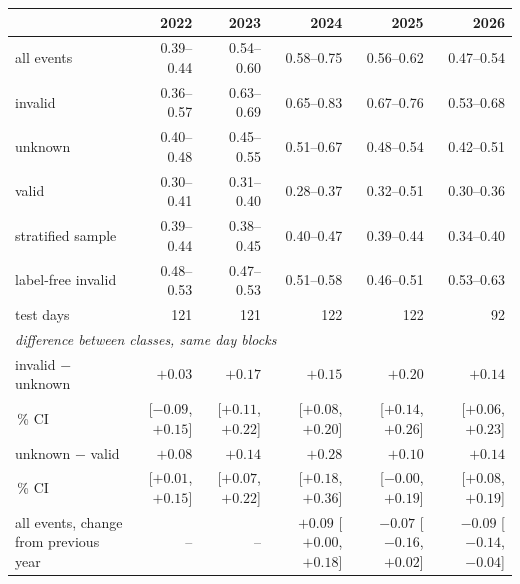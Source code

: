 \begin{tabular}{lrrrrr}
\toprule
 & 2022 & 2023 & 2024 & 2025 & 2026 \\
\midrule
all events & 0.39--0.44 & 0.54--0.60 & 0.58--0.75 & 0.56--0.62 & 0.47--0.54 \\
\quad invalid & 0.36--0.57 & 0.63--0.69 & 0.65--0.83 & 0.67--0.76 & 0.53--0.68 \\
\quad unknown & 0.40--0.48 & 0.45--0.55 & 0.51--0.67 & 0.48--0.54 & 0.42--0.51 \\
\quad valid & 0.30--0.41 & 0.31--0.40 & 0.28--0.37 & 0.32--0.51 & 0.30--0.36 \\
stratified sample & 0.39--0.44 & 0.38--0.45 & 0.40--0.47 & 0.39--0.44 & 0.34--0.40 \\
label-free invalid & 0.48--0.53 & 0.47--0.53 & 0.51--0.58 & 0.46--0.51 & 0.53--0.63 \\
test days & 121 & 121 & 122 & 122 & 92 \\
\midrule
\multicolumn{6}{l}{\emph{difference between classes, same day blocks}} \\
invalid $-$ unknown & $+0.03$ & $+0.17$ & $+0.15$ & $+0.20$ & $+0.14$ \\
\quad 95\,\% CI & [$-0.09$, $+0.15$] & [$+0.11$, $+0.22$] & [$+0.08$, $+0.20$] & [$+0.14$, $+0.26$] & [$+0.06$, $+0.23$] \\
unknown $-$ valid & $+0.08$ & $+0.14$ & $+0.28$ & $+0.10$ & $+0.14$ \\
\quad 95\,\% CI & [$+0.01$, $+0.15$] & [$+0.07$, $+0.22$] & [$+0.18$, $+0.36$] & [$-0.00$, $+0.19$] & [$+0.08$, $+0.19$] \\
\midrule
all events, change from previous year & -- & -- & $+0.09$ [$+0.00$, $+0.18$] & $-0.07$ [$-0.16$, $+0.02$] & $-0.09$ [$-0.14$, $-0.04$] \\
\bottomrule
\end{tabular}
